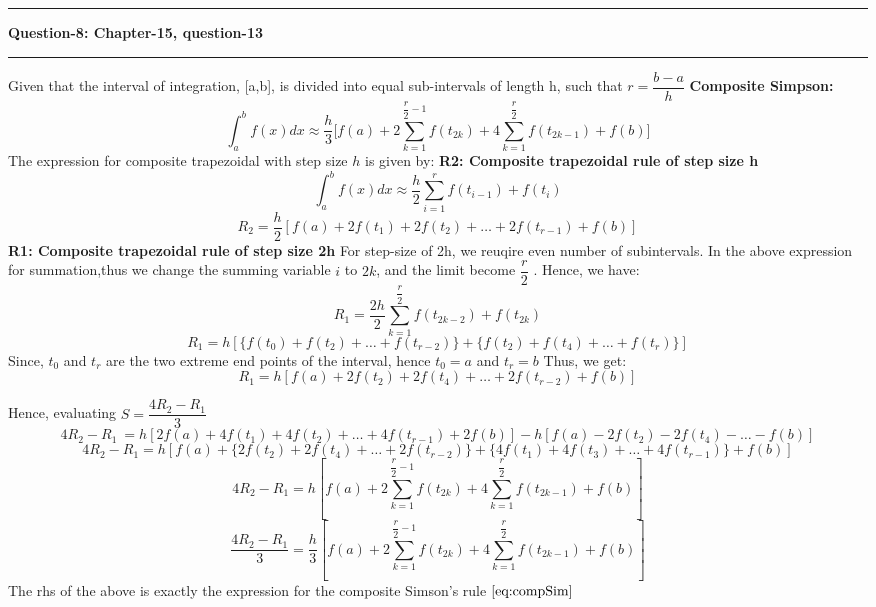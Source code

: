 \documentclass{article}
\newcommand\question[2]{\vspace{.25in}\hrule\textbf{#1: #2}\hrule\vspace{.10in}}
\begin{document}
  \question{Question-8}{Chapter-15, question-13}
  Given that the interval of integration, [a,b], is divided into equal sub-intervals of length h, such that $r = \dfrac{b-a}{h}$
  \textbf {Composite Simpson:}\newline
  \begin{equation}
	  \int_{a}^{b} f(x) dx \approx \dfrac{h}{3}\bigg [ f(a) + 2\sum_{k=1}^{\dfrac{r}{2}-1} f(t_{2k}) + 4\sum_{k=1}^{\dfrac{r}{2}}f(t_{2k-1}) + f(b)\bigg ]
	  \label{eq:compSim}
  \end{equation}
  The expression for composite trapezoidal with step size $h$ is given by: \newline
  \textbf {R2: Composite trapezoidal rule of step size h}
  \[ \int_{a}^{b}f(x)dx \approx \dfrac{h}{2} \sum_{i=1}^{r} f(t_{i-1}) + f(t_i)\]
  \[R_2 = \dfrac{h}{2}[ f(a) + 2f(t_1) + 2f(t_2) + \dots + 2f(t_{r-1}) + f(b) ]\]
  \textbf {R1: Composite trapezoidal rule of step size 2h}
  For step-size of 2h, we reuqire even number of subintervals. In the above expression for summation,thus we change the summing variable $i$ to $2k$, and the limit become $\dfrac{r}{2}$ . Hence, we have:
  \[R_1 = \dfrac{2h}{2}\sum_{k=1}^{\dfrac{r}{2}} f(t_{2k-2}) + f(t_{2k})\]
  \[R_1 = h[ \{f(t_0) + f(t_2) + \dots + f(t_{r-2})\} + \{ f(t_2) + f(t_4) + \dots + f(t_r) \} ]\]
  Since, $t_0$ and $t_r$ are the two extreme end points of the interval, hence $t_0 = a$ and $t_r = b$
  Thus, we get:
  \[R_1 = h[f(a) + 2f(t_2) + 2f(t_4) + \dots + 2f(t_{r-2}) + f(b)]\]

  Hence, evaluating $S = \dfrac{4R_2 - R_1}{3}$
  \[4R_2 - R_1\ = h[2f(a) + 4f(t_1) + 4f(t_2)+\dots+4f(t_{r-1}) + 2f(b)] - h[f(a) - 2f(t_2) - 2f(t_4) - \dots-f(b)]\]
  \[4R_2 - R_1 = h[ f(a) + \{2f(t_2) + 2f(t_4) +\dots+2f(t_{r-2})\} + \{ 4f(t_1)+4f(t_3) + \dots+4f(t_{r-1})\} + f(b) ]\]
  \[4R_2 - R_1 = h[ f(a) + 2\sum_{k=1}^{\dfrac{r}{2}-1}f(t_{2k}) + 4\sum_{k=1}^{\dfrac{r}{2}}f(t_{2k-1}) + f(b)]\]
  \[\dfrac{4R_2 - R_1}{3} = \dfrac{h}{3}[ f(a) + 2\sum_{k=1}^{\dfrac{r}{2}-1}f(t_{2k}) + 4\sum_{k=1}^{\dfrac{r}{2}}f(t_{2k-1}) + f(b)]\]
  The rhs of the above is exactly the expression for the composite Simson's rule $\eqref{eq:compSim}$
\end{document}
